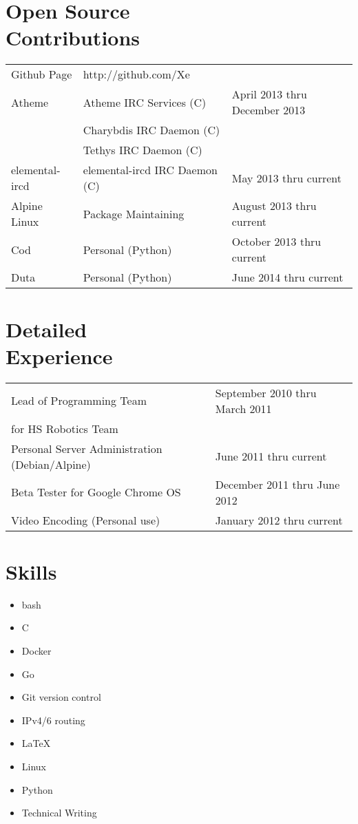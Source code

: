 \documentclass[line, margin]{res}
\begin{document}
\address{+1 (425) 221-7761}

\begin{resume}

	\section{Open Source \\ Contributions}
	\begin{tabular}{l l l}
		Github Page & \hfill http://github.com/Xe & \\ [5pt]
		Atheme & \hfill Atheme IRC Services (C) & \hfill April 2013 thru December 2013 \\ 
	 & \hfill Charybdis IRC Daemon (C) \\
	 & \hfill Tethys IRC Daemon (C) \\
		elemental-ircd & \hfill elemental-ircd IRC Daemon (C) & \hfill May 2013 thru current \\
		Alpine Linux & \hfill Package Maintaining & \hfill August 2013 thru current \\
		Cod & \hfill Personal (Python) & \hfill October 2013 thru current \\
		Duta & \hfill Personal (Python) & \hfill June 2014 thru current
	\end{tabular}

	\section{Detailed \\ Experience}
	\begin{tabular}{l l}
		Lead of Programming Team & \hfill September 2010 thru March 2011 \\ 
		for HS Robotics Team & \\
		Personal Server Administration (Debian/Alpine) & \hfill June 2011 thru current  \\
		Beta Tester for Google Chrome OS & \hfill December 2011 thru June 2012 \\
		Video Encoding (Personal use) & January 2012 thru current \\
	\end{tabular}

	\section{Skills}
	\begin{multicols}{3}
		\begin{itemize}
			\item bash
			\item C
			\item Docker
			\item Go
			\item Git version control
			\item IPv4/6 routing
			\item \LaTeX
			\item Linux
			\item Python
			\item Technical Writing
		\end{itemize}
	\end{multicols}


\end{resume}
\end{document}
